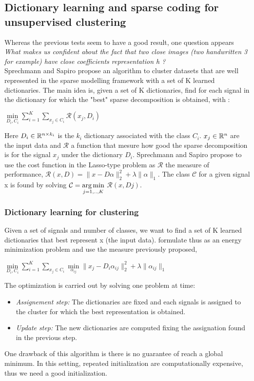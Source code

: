 \subsection{Dictionary learning and sparse coding for unsupervised clustering}
\label{sec:Clustering}
Whereas the previous tests seem to have a good result, one question appears \\ \textit{What makes us confident about the fact that two close images (two handwritten 3 for example) have close coefficients representation h ?}\\
Sprechmann and Sapiro \cite{5494985} propose an algorithm to cluster datasets that are well represented in the sparse modelling framework with a set of K learned dictionaries. The main idea is, given a set of K dictionaries, find for each signal in the dictionary for which the "best" sparse decomposition is obtained, with :

\begin{center}
$\underset{D_i,C_i}{\min} \sum_{i=1}^{K} \sum_{x_j \in C_i} \mathcal{R}(x_j, D_i)$
 
\end{center}
Here $D_i \in \mathbb{R}^{n \times k_i}$ is the $k_i$ dictionary associated with the class $C_i$. $x_j \in \mathbb{R}^n$ are the input data and $\mathcal{R}$  a function that mesure how good the sparse decomposition is for the signal $x_j$ under the dictionary $D_i$. Sprechmann and Sapiro propose to use the cost function in the Lasso-type problem as $\mathcal{R}$ the measure of performance, $\mathcal{R}(x,D) = \|x - D\alpha\|^2_2 + \lambda \|\alpha\|_1$. The class $\mathcal{C}$ for a given signal x is found by solving $\mathcal{C}= \underset{j=1,..,K}{\operatorname*{arg\,min}}$ $ \mathcal{R}(x,Dj) $.

\subsubsection{Dictionary learning for clustering}
Given a set of signals and number of classes, we want to find a set of K learned dictionaries that best represent x (the input data). \cite{5494985} formulate thus as an energy minimization problem and use the measure previously proposed,\\
\begin{center}
 $\underset{D_i,C_i}{\min} \sum_{i=1}^{K} \sum_{x_j \in C_i} \underset{\alpha_{ij}}{\min}\|x_j - D_i \alpha_{ij}\|^2_2 + \lambda\|\alpha_{ij}\|_1$
\end{center}
The optimization is carried out by solving one problem at time:
\begin{itemize}
 \item \textit{Assignement step:} The dictionaries are fixed and each signals is assigned to the cluster for which the best representation is obtained.
 \item \textit{Update step:} The new dictionaries are computed fixing the assignation found in the previous step.
\end{itemize}
One drawback of this algorithm is there is no guarantee of reach a global minimum. In this setting, repeated initialization are computationally expensive, thus we need a good initialization.

